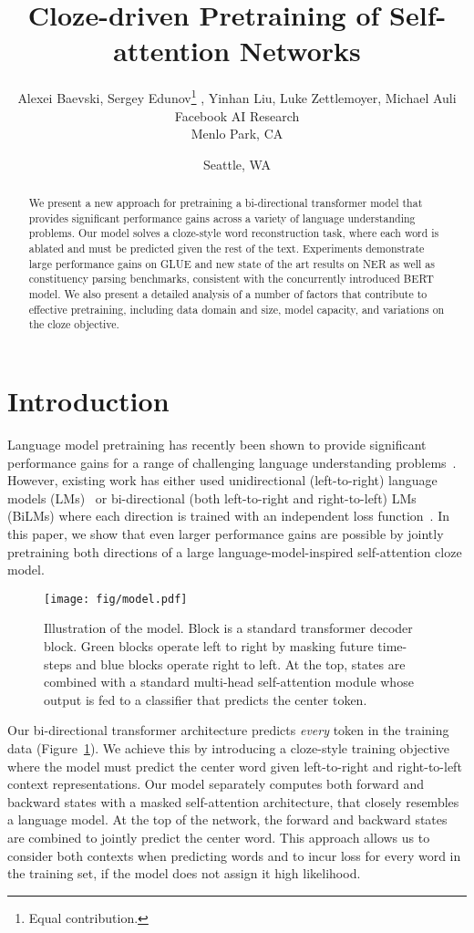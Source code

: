 \documentclass[11pt,a4paper]{article}
\title{Cloze-driven Pretraining of Self-attention Networks}
\author{Alexei Baevski, Sergey Edunov\thanks{\hspace{0.06in}Equal contribution.} , Yinhan Liu\samethanks{}\hspace{0.05in}, Luke Zettlemoyer, Michael Auli \\
  Facebook AI Research \\
  Menlo Park, CA \and Seattle, WA \\
}
\date{}
\begin{document}
\maketitle
\begin{abstract}
We present a new approach for pretraining a bi-directional transformer model that provides significant performance gains across a variety of language understanding problems. 
Our model solves a cloze-style word reconstruction task, where each word is ablated and must be predicted given the rest of the text. 
Experiments demonstrate large performance gains on GLUE and new state of the art results on NER as well as constituency parsing benchmarks, consistent with the concurrently introduced BERT model.
We also present a detailed analysis of a number of factors that contribute to effective pretraining, including data domain and size, model capacity, and variations on the cloze objective.
\end{abstract}


\section{Introduction}

Language model pretraining has recently been shown to provide significant performance gains for a range of challenging language understanding problems~\citep{dai2015arxiv,peters2018acl,radford2018unsup}. 
However, existing work has either used unidirectional (left-to-right) language models (LMs)~\citep{radford2018unsup} or bi-directional (both left-to-right and right-to-left) LMs (BiLMs) where each direction is trained with an independent loss function~\cite{peters2018acl}. 
In this paper, we show that even larger performance gains are possible by jointly pretraining both directions of a large language-model-inspired self-attention cloze model. 
\begin{figure}[t]
\centering
\texttt{[image: fig/model.pdf]}
\caption{Illustration of the model. Block is a standard transformer decoder block. Green blocks operate left to right by masking future time-steps and blue blocks operate right to left. At the top, states are combined with a standard multi-head self-attention module whose output is fed to a classifier that predicts the center token.
}
\label{fig:model}
\end{figure}

Our bi-directional transformer architecture predicts \emph{every} token in the training data (Figure~\ref{fig:model}).
We achieve this by introducing a cloze-style training objective where the model must predict the center word given left-to-right and right-to-left context representations. 
Our model separately computes both forward and backward states with a masked self-attention architecture, that closely resembles a language model.
At the top of the network, the forward and backward states are combined to jointly predict the center word.
This approach allows us to consider both contexts when predicting words and to incur loss for every word in the training set, if the model does not assign it high likelihood. 
\end{document}

